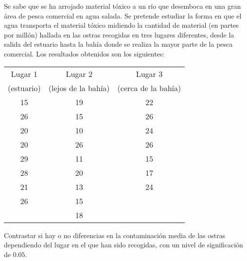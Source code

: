 {Se sabe que se ha arrojado material tóxico a un río que desemboca en una gran área de pesca comercial en agua salada.
Se pretende estudiar la forma en que el agua transporta el material tóxico midiendo la cantidad de material (en partes por millón) hallada en las ostras recogidas en tres lugares diferentes, desde la salida del estuario hasta la bahía donde se realiza la mayor parte de la pesca comercial.
Los resultados obtenidos son los
siguientes:
\begin{center}
\begin{tabular}{lll}
\hline
\multicolumn{1}{c}{Lugar 1} & \multicolumn{1}{c}{Lugar 2} & \multicolumn{1}{c}{Lugar 3} \\
\multicolumn{1}{c}{(estuario)} & \multicolumn{1}{c}{(lejos de la bahía)} & \multicolumn{1}{c}{(cerca de la bahía)} \\
\hline
\multicolumn{1}{c}{15} & \multicolumn{1}{c}{19} & \multicolumn{1}{c}{22} \\
\multicolumn{1}{c}{26} & \multicolumn{1}{c}{15} & \multicolumn{1}{c}{26} \\
\multicolumn{1}{c}{20} & \multicolumn{1}{c}{10} & \multicolumn{1}{c}{24} \\
\multicolumn{1}{c}{20} & \multicolumn{1}{c}{26} & \multicolumn{1}{c}{26} \\
\multicolumn{1}{c}{29} & \multicolumn{1}{c}{11} & \multicolumn{1}{c}{15} \\
\multicolumn{1}{c}{28} & \multicolumn{1}{c}{20} & \multicolumn{1}{c}{17} \\
\multicolumn{1}{c}{21} & \multicolumn{1}{c}{13} & \multicolumn{1}{c}{24} \\
\multicolumn{1}{c}{26} & \multicolumn{1}{c}{15} & \multicolumn{1}{c}{} \\
\multicolumn{1}{c}{} & \multicolumn{1}{c}{18} & \multicolumn{1}{c}{} \\
\hline
\end{tabular}
\end{center}
Contrastar si hay o no diferencias en la contaminación media de las ostras dependiendo del lugar en el que han sido recogidas, con un nivel de significación de $0.05$.
}



